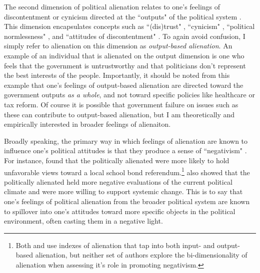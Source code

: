 \documentclass[12pt]{article}
\begin{document}
The second dimension of political alienation relates to one's feelings of discontentment or cynicism directed at the ``outputs" of the political system \parencite{almond1963civic,easton1965systems}. This dimension encapsulates concepts such as ``(dis)trust" \parencite{aberbach1969alienation}, ``cynicism" \parencite{southwell1998electoral}, ``political normlessness" \parencite{finifter1970dimensions}, and ``attitudes of discontentment" \parencite{olsen1969}. To again avoid confusion, I simply refer to alienation on this dimension as \textit{output-based alienation}. An example of an individual that is alienated on the output dimension is one who feels that the government is untrustworthy and that politicians don't represent the best interests of the people. Importantly, it should be noted from this example that one's feelings of output-based alienation are directed toward the government outputs \textit{as a whole}, and not toward specific policies like healthcare or tax reform. Of course it is possible that government failure on issues such as these can contribute to output-based alienation, but I am theoretically and empirically interested in broader feelings of alienaiton. 


Broadly speaking, the primary way in which feelings of alienation are known to influence one's political attitudes is that they produce a sense of ``negativism" \parencite{horton1962powerlessness}. For instance, \textcite{thompson1960} found that the politically alienated were more likely to hold unfavorable views toward a local school bond referendum.\footnote{Both \textcite{thompson1960} and \textcite{citrin1975} use indexes of alienation that tap into both input- and output-based alienation, but neither set of authors explore the bi-dimensionality of alienation when assessing it's role in promoting negativism.} \textcite{citrin1975} also showed that the politically alienated held more negative evaluations of the current political climate and were more willing to support systemic change. This is to say that one's feelings of political alienation from the broader political system are known to spillover into one's attitudes toward more specific objects in the political environment, often casting them in a negative light. 
\end{document}
